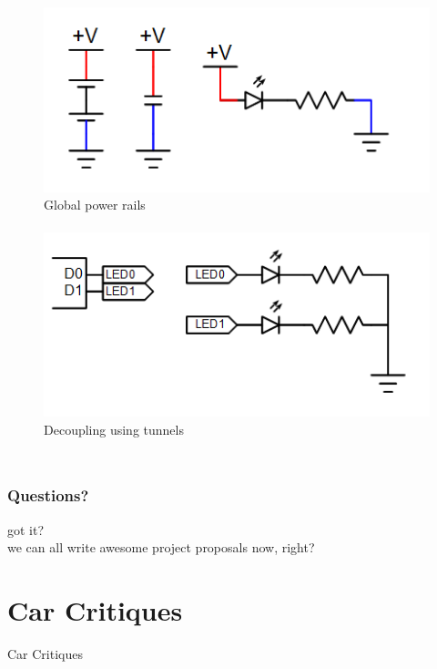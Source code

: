 \documentclass{beamer}
\begin{document}
\begin{frame}
\begin{columns}[t]
\begin{figure}
  \centering
  \includegraphics[width=1.0\columnwidth]{images-dis2/style-powerrails} \\
  Global power rails \\
  \hfill \\
  \includegraphics[width=1.0\columnwidth]{images-dis2/style-airwire} \\
  Decoupling using tunnels \\
\end{figure}
\end{columns}
\end{frame}

\begin{frame}
\frametitle{Questions?}
\centering
{\huge got it?} \\
\vspace{20px}
\tiny{we can all write awesome project proposals now, right?}
\end{frame}

\section{Car Critiques} %
\begin{frame}
\centering \huge Car Critiques
\end{frame}
\end{document}
